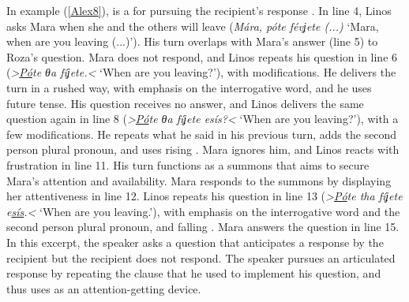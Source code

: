 \documentclass[output=paper]{LSP/langsci}
\begin{document}
In example (\ref{Alex8}),  is a  for pursuing the recipient’s response \citep{pomeratz84}. In line 4, Linos asks Mara when she and the others will leave (\textit{Mára, póte févʝete (...)} `Mara, when are you leaving (...)'). His turn overlaps with Mara’s answer (line 5) to Roza’s question. Mara does not respond, and Linos repeats his question in line 6 (\textit{>\underline{Pó}te θa fíʝete.< } `When are you leaving?'), with modifications. He delivers the turn in a rushed way, with emphasis on the interrogative word, and he uses future tense. His question receives no answer, and Linos delivers the same question again in line 8 (\textit{>\underline{Pó}te θa fíʝete esís?<} `When are you leaving?'), with a few modifications. He repeats what he said in his previous turn, adds the second person plural pronoun, and uses rising . Mara ignores him, and Linos reacts with frustration in line 11. His turn functions as a summons \citep{schegloff68} that aims to secure Mara’s attention and availability. Μara responds to the summons by displaying her attentiveness in line 12. Linos repeats his question in line 13 (\textit{>\underline{Pó}te tha fíʝete e\underline{sís}.<} `When are you leaving.'), with emphasis on the interrogative word and the second person plural pronoun, and falling . Mara answers the question in line 15. In this excerpt, the speaker asks a question that anticipates a response by the recipient but the recipient does not respond. The speaker pursues an articulated response by repeating the clause that he used to implement his question, and thus uses  as an attention-getting device. 
\end{document}
